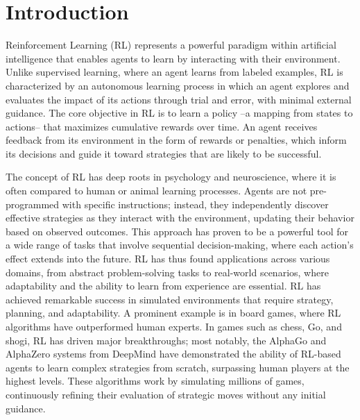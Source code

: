 \chapter{Introduction}

Reinforcement Learning (RL) represents a powerful paradigm within artificial intelligence that enables agents to learn
by interacting with their environment.
Unlike supervised learning, where an agent learns from labeled examples, RL is characterized by an autonomous learning
process in which an agent explores and evaluates the impact of its actions through trial and error, with minimal
external guidance.
The core objective in RL is to learn a policy --a mapping from states to actions-- that maximizes cumulative rewards over
time.
An agent receives feedback from its environment in the form of rewards or penalties, which inform its decisions and
guide it toward strategies that are likely to be successful.

The concept of RL has deep roots in psychology and neuroscience, where it is often compared to human or animal learning
processes.
Agents are not pre-programmed with specific instructions; instead, they independently discover effective strategies as
they interact with the environment, updating their behavior based on observed outcomes.
This approach has proven to be a powerful tool for a wide range of tasks that involve sequential decision-making, where
each action’s effect extends into the future.
RL has thus found applications across various domains, from abstract problem-solving tasks to real-world scenarios,
where adaptability and the ability to learn from experience are essential.
RL has achieved remarkable success in simulated environments that require strategy, planning, and adaptability.
A prominent example is in board games, where RL algorithms have outperformed human experts.
In games such as chess, Go, and shogi, RL has driven major breakthroughs; most notably, the AlphaGo and AlphaZero
systems from DeepMind have demonstrated the ability of RL-based agents to learn complex strategies from scratch,
surpassing human players at the highest levels.
These algorithms work by simulating millions of games, continuously refining their evaluation of strategic moves
without any initial guidance.

